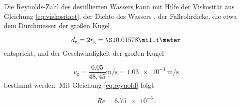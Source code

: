 Die Reynolds-Zahl des destillierten Wassers kann mit Hilfe der Viskosität aus
Gleichung \eqref{eq:viskositaet}, der Dichte des Wassers \cite{TfCuP},
der Fallrohrdicke, die etwa dem Durchmesser der großen Kugel

\begin{equation}
  d_\text{g} = 2 r_\text{g} = \grosseKugelDurchmesser
\end{equation}
entspricht, und der Geschwindigkeit der großen Kugel

\begin{equation}
  v_\text{g} = \frac{0.05}{48,45}\si{\meter\per\second} =
  \SI{1.03e-3}{\meter\per\second}
\end{equation}
bestimmt werden.
Mit Gleichung \eqref{eq:reynold} folgt

\begin{equation}
  Re = \num{6.75e-6}.
\end{equation}